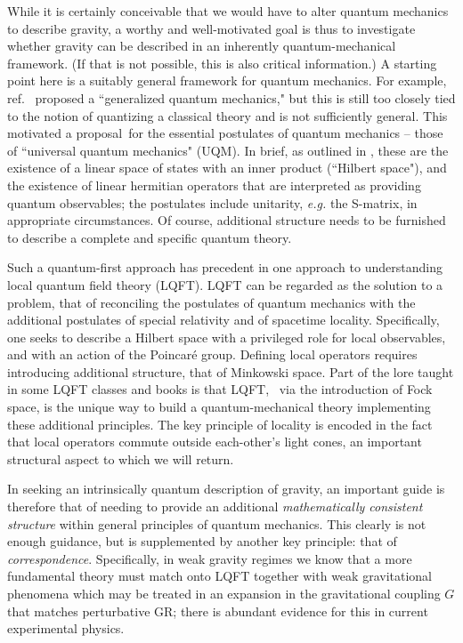While it is certainly conceivable that we would have to alter quantum mechanics to describe gravity, a worthy and well-motivated goal is  thus to investigate whether gravity can be described in an inherently quantum-mechanical framework.  (If that is not possible, this is also critical information.)  A starting point here is a suitably general framework for quantum mechanics. For example, ref.~ proposed a ``generalized quantum mechanics,"  but this is still too closely tied to the notion of quantizing a classical theory and is not sufficiently general.  This motivated a proposal\UQM\ for the essential postulates of quantum mechanics -- those of ``universal quantum mechanics"  (UQM).  In brief, as outlined in \UQM, these are the existence of a linear space of states with an inner product (``Hilbert space"), and the existence of linear hermitian operators that are interpreted as providing quantum observables; the postulates include unitarity, {\it e.g.} the S-matrix, in appropriate circumstances.  Of course, additional structure needs to be furnished to describe a complete and specific quantum theory.

Such a quantum-first approach has precedent in one approach to understanding local quantum field theory (LQFT).  LQFT can be regarded as the solution to a problem, that of reconciling the postulates of quantum mechanics with the additional  postulates of special relativity and of  spacetime locality.  Specifically, one seeks to describe a Hilbert space with a privileged role for local observables, and with an action of the Poincar\'e group.  Defining local operators requires introducing additional structure, that of Minkowski space.  Part of the lore taught in some LQFT classes and books is that LQFT, \eg\ via the introduction of Fock space, is the unique way to build a quantum-mechanical theory implementing these additional principles.  The key principle of locality is encoded in the fact that local operators commute outside each-other's light cones, an important structural aspect to which we will return.

In seeking an intrinsically quantum description of gravity, an important guide is therefore that of needing to provide an additional {\it mathematically consistent structure} within  general principles of quantum mechanics.  This clearly is not enough guidance, but is supplemented by another key principle: that of {\it correspondence}.  Specifically, in weak gravity regimes we know that a more fundamental theory must match onto LQFT together with weak gravitational phenomena which may be treated in an expansion in the gravitational coupling $G$ that matches perturbative GR; there is abundant evidence for this in current experimental physics.  

